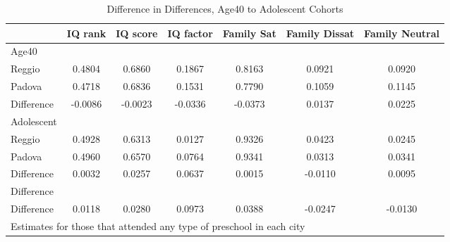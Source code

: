 \begin{table}[htbp]\centering
\caption{Difference in Differences, Age40 to Adolescent Cohorts}
\begin{tabular}{l*{6}{c}}
\hline\hline
            &     IQ rank&    IQ score&   IQ factor&  Family Sat&Family Dissat&Family Neutral\\
\hline
Age40       &            &            &            &            &            &            \\
Reggio      &      0.4804&      0.6860&      0.1867&      0.8163&      0.0921&      0.0920\\
Padova      &      0.4718&      0.6836&      0.1531&      0.7790&      0.1059&      0.1145\\
Difference  &     -0.0086&     -0.0023&     -0.0336&     -0.0373&      0.0137&      0.0225\\
\hline
Adolescent  &            &            &            &            &            &            \\
Reggio      &      0.4928&      0.6313&      0.0127&      0.9326&      0.0423&      0.0245\\
Padova      &      0.4960&      0.6570&      0.0764&      0.9341&      0.0313&      0.0341\\
Difference  &      0.0032&      0.0257&      0.0637&      0.0015&     -0.0110&      0.0095\\
\hline
Difference  &            &            &            &            &            &            \\
Difference  &      0.0118&      0.0280&      0.0973&      0.0388&     -0.0247&     -0.0130\\
\hline\hline
\multicolumn{7}{l}{\footnotesize Estimates for those that attended any type of preschool in each city}\\
\end{tabular}
\end{table}
